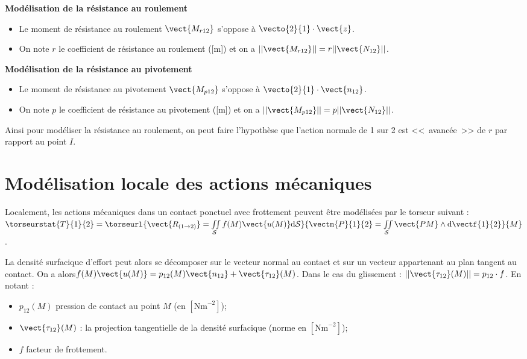 \noindent\begin{minipage}[t]{.49\linewidth}
\begin{center}
\textbf{Modélisation de la résistance au roulement}
\end{center}
\begin{itemize}
\item Le moment de résistance au roulement $\vect{M_{r12}}$ s'oppose à $\vecto{2}{1}\cdot \vect{z}$. 
\item On note $r$ le coefficient de résistance au roulement ([m]) et on a $||\vect{M_{r12}}||=r||\vect{N_{12}} ||$.
\end{itemize}

\end{minipage}\hfill
\begin{minipage}[t]{.49\linewidth}
\begin{center}
\textbf{Modélisation de la résistance au pivotement}
\end{center}
\begin{itemize}
\item Le moment de résistance au pivotement $\vect{M_{p12}}$ s'oppose à $\vecto{2}{1}\cdot \vect{n_{12}}$. 
\item On note $p$ le coefficient de résistance au pivotement ([m]) et on a $||\vect{M_{p12}}||=p||\vect{N_{12}} ||$.
\end{itemize}
\end{minipage}

\vspace{1cm}


Ainsi pour modéliser la résistance au roulement, on peut faire l'hypothèse que l'action normale de 1 sur 2 est <<~avancée~>> de $r$ par rapport au point $I$. 


\section{Modélisation locale des actions mécaniques}
\begin{defi}
Localement, les actions mécaniques dans un contact ponctuel avec frottement peuvent être modélisées par le torseur suivant :
$
\torseurstat{T}{1}{2}=
\torseurl{%
\vect{R_{(1\rightarrow 2)}} 
= \iint\limits_{\mathcal{S}} f(M) \vect{u(M)} \text{d}\mathcal{S}}{%
\vectm{P}{1}{2} = \iint\limits_{\mathcal{S}}\vect{PM}\wedge \text{d}\vectf{1}{2}}{M}
$.

La densité surfacique d'effort peut alors se décomposer sur le vecteur normal au contact et sur un vecteur appartenant au plan tangent au contact. On a alors$f(M) \vect{u(M)} = p_{12}(M)\vect{n_{12}}+\vect{\tau_{12}}(M)$. 
Dans le cas du glissement : $||\vect{\tau_{12}}(M)||=p_{12}\cdot f$.
En notant : 
\begin{itemize}
\item $p_{12}(M)$ pression de contact au point $M$ (en $\left[\text{Nm}^{-2}\right]$);
\item $\vect{\tau_{12}}(M)$ : la projection tangentielle de la densité surfacique (norme en $\left[\text{Nm}^{-2}\right]$);
\item $f$ facteur de frottement.
\end{itemize}
\end{defi}

